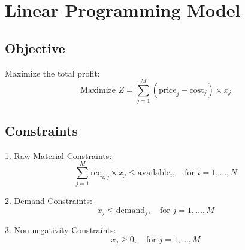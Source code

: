 \documentclass{article}
\begin{document}
\section*{Linear Programming Model}

\subsection*{Objective}
Maximize the total profit:
\[
\text{Maximize } Z = \sum_{j=1}^{M} (\text{price}_j - \text{cost}_j) \times x_j
\]

\subsection*{Constraints}
1. Raw Material Constraints:
\[
\sum_{j=1}^{M} \text{req}_{i,j} \times x_j \leq \text{available}_i, \quad \text{for } i = 1, \ldots, N
\]

2. Demand Constraints:
\[
x_j \leq \text{demand}_j, \quad \text{for } j = 1, \ldots, M
\]

3. Non-negativity Constraints:
\[
x_j \geq 0, \quad \text{for } j = 1, \ldots, M
\]
\end{document}
